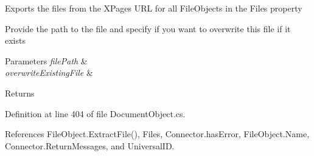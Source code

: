 Exports the files from the X\+Pages U\+RL for all File\+Objects in the Files property 

Provide the path to the file and specify if you want to overwrite this file if it exists


\begin{DoxyParams}{Parameters}
{\em file\+Path} & \\
\hline
{\em overwrite\+Existing\+File} & \\
\hline
\end{DoxyParams}
\begin{DoxyReturn}{Returns}

\end{DoxyReturn}


Definition at line 404 of file Document\+Object.\+cs.



References File\+Object.\+Extract\+File(), Files, Connector.\+has\+Error, File\+Object.\+Name, Connector.\+Return\+Messages, and Universal\+ID.


